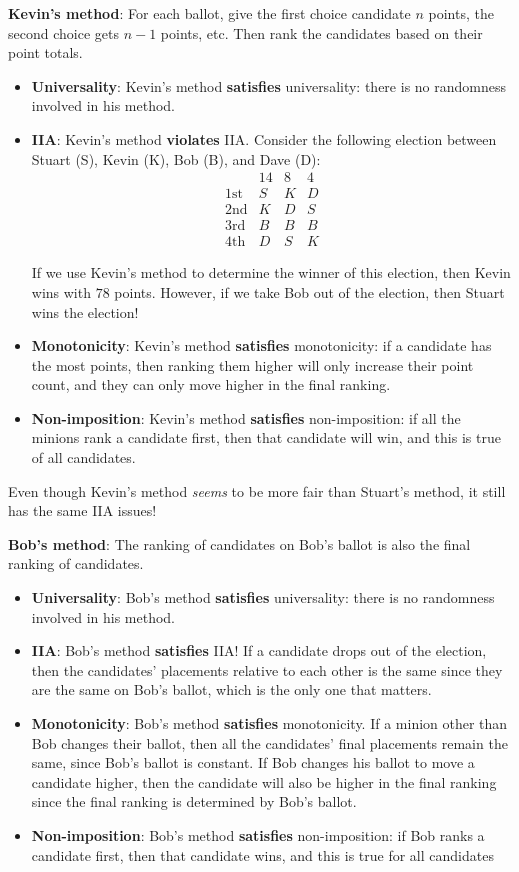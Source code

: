 \documentclass{article}
\begin{document}
\textbf{Kevin’s method}: For each ballot, give the first choice candidate $n$ points, the second choice gets $n-1$ points, etc. Then rank the candidates based on their point totals. 
\begin{itemize}
	\item \textbf{Universality}: Kevin’s method \textbf{satisfies} universality: there is no randomness involved in his method.
	\item \textbf{IIA}: Kevin’s method \textbf{violates} IIA. Consider the following election between Stuart (S), Kevin (K), Bob (B), and Dave (D):
	\[
		\begin{array}{c|ccc}
				& 14 & 8 & 4 \\
			\text{1st} & S & K & D \\
			\text{2nd} & K & D & S \\
			\text{3rd} & B & B & B \\
			\text{4th} & D & S & K
		\end{array}
	\]

	If we use Kevin’s method to determine the winner of this election, then Kevin wins with $78$ points. However, if we take Bob out of the election, then Stuart wins the election! 
	\item \textbf{Monotonicity}: Kevin’s method \textbf{satisfies} monotonicity: if a candidate has the most points, then ranking them higher will only increase their point count, and they can only move higher in the final ranking.
	\item \textbf{Non-imposition}: Kevin’s method \textbf{satisfies} non-imposition: if all the minions rank a candidate first, then that candidate will win, and this is true of all candidates. 
\end{itemize}
Even though Kevin’s method \textit{seems} to be more fair than Stuart's method, it still has the same IIA issues! 

\textbf{Bob’s method}: The ranking of candidates on Bob’s ballot is also the final ranking of candidates. 
\begin{itemize}
	\item \textbf{Universality}: Bob’s method \textbf{satisfies} universality: there is no randomness involved in his method.
	\item \textbf{IIA}: Bob’s method \textbf{satisfies} IIA! If a candidate drops out of the election, then the candidates’ placements relative to each other is the same since they are the same on Bob’s ballot, which is the only one that matters.
	\item \textbf{Monotonicity}: Bob’s method \textbf{satisfies} monotonicity. If a minion other than Bob changes their ballot, then all the candidates’ final placements remain the same, since Bob’s ballot is constant. If Bob changes his ballot to move a candidate higher, then the candidate will also be higher in the final ranking since the final ranking is determined by Bob’s ballot. 
	\item \textbf{Non-imposition}: Bob’s method \textbf{satisfies} non-imposition: if Bob ranks a candidate first, then that candidate wins, and this is true for all candidates
\end{itemize}
\end{document}
